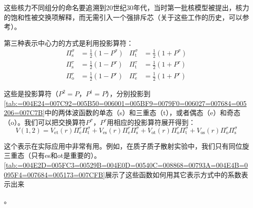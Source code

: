 这些核力不同组分的命名要追溯到20世纪30年代，当时第一批核模型被提出，核力的饱和性被交换项解释，而无需引入一个强排斥芯（关于这些工作的历史，可以参考\cite{Br65a}）。

第三种表示中心力的方式是利用投影算符：
\begin{align*}
\Pi^{\sigma}_{\text{s}} & =\frac{1}{2}(1-P^{\sigma}) & \Pi^{\sigma}_{\text{t}} & =\frac{1}{2}(1+P^{\sigma})\\
\Pi^{\tau}_{\text{s}} & =\frac{1}{2}(1-P^{\tau}) & \Pi^{\tau}_{\text{t}} & =\frac{1}{2}(1+P^{\tau})\\
\Pi^{r}_{\text{o}} & =\frac{1}{2}(1-P^{r}) & \Pi^{r}_{\text{e}} & =\frac{1}{2}(1+P^{r})
\end{align*}

这些是投影算符（$P^{2}=P$，$P^{\dagger}=P$），分别投影到\ref{tab:=004E24=007C92=005B50=006001=005BF9=0079F0=006027=007684=005206=007C7B}中的两体波函数的单态（s）和三重态（t），或者偶态（e）和奇态（o）。我们可以把交换算符$P^{\sigma}$，$P^{r}$用相应的投影算符展开得到：
\[
V(1,2)=V_{\text{et}}(r)\Pi^{r}_{\text{e}}\Pi^{\sigma}_{\text{t}}+V_{\text{es}}(r)\Pi^{r}_{\text{e}}\Pi^{\sigma}_{\text{s}}+V_{\text{ot}}(r)\Pi^{r}_{\text{o}}\Pi^{\sigma}_{\text{t}}+V_{\text{os}}(r)\Pi^{r}_{\text{o}}\Pi^{\sigma}_{\text{s}}
\]

这个表示在实际应用中非常有用。例如，在质子质子散射实验中，我们只有同位旋三重态（只有es和ot是重要的）。\ref{tab:=004E2D=005FC3=00529B=004E0D=00540C=008868=00793A=004E4B=0095F4=007684=005173=007CFB}展示了这些函数如何用其它表示方式中的系数表示出来

。

